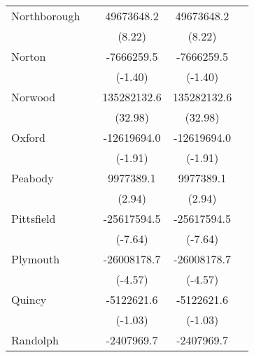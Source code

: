 {\begin{tabular}{l*{4}{c}}
\addlinespace
Northborough        &                     &  49673648.2\sym{***}&  49673648.2\sym{***}&                     \\
                    &                     &      (8.22)         &      (8.22)         &                     \\
\addlinespace
Norton              &                     &  -7666259.5         &  -7666259.5         &                     \\
                    &                     &     (-1.40)         &     (-1.40)         &                     \\
\addlinespace
Norwood             &                     & 135282132.6\sym{***}& 135282132.6\sym{***}&                     \\
                    &                     &     (32.98)         &     (32.98)         &                     \\
\addlinespace
Oxford              &                     & -12619694.0         & -12619694.0         &                     \\
                    &                     &     (-1.91)         &     (-1.91)         &                     \\
\addlinespace
Peabody             &                     &   9977389.1\sym{**} &   9977389.1\sym{**} &                     \\
                    &                     &      (2.94)         &      (2.94)         &                     \\
\addlinespace
Pittsfield          &                     & -25617594.5\sym{***}& -25617594.5\sym{***}&                     \\
                    &                     &     (-7.64)         &     (-7.64)         &                     \\
\addlinespace
Plymouth            &                     & -26008178.7\sym{***}& -26008178.7\sym{***}&                     \\
                    &                     &     (-4.57)         &     (-4.57)         &                     \\
\addlinespace
Quincy              &                     &  -5122621.6         &  -5122621.6         &                     \\
                    &                     &     (-1.03)         &     (-1.03)         &                     \\
\addlinespace
Randolph            &                     &  -2407969.7         &  -2407969.7         &                     \\

\end{tabular}}
